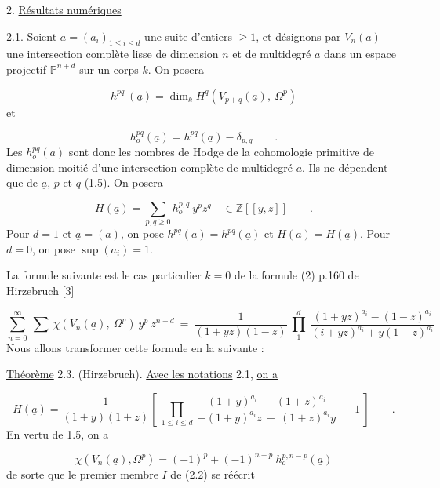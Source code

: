 2. \underline{Résultats numériques}

2.1. Soient $\underline{a}=(a_i)_{1\leq i\leq d}$ une suite d'entiers $\geq 1$, et désignons par $V_n(\underline{a})$ une intersection complète lisse de dimension $n$ et de multidegré $\underline{a}$ dans un espace projectif $\mathbb{P}^{n+d}$ sur un corps $k$. On posera

\begin{equation*}
h^{pq}\ (\underline{a}) = \dim_k H^q(V_{p+q}(\underline{a}),\ \Omega^p)
\end{equation*}
et

\begin{equation*}
h_o^{pq}(\underline{a}) = h^{pq}(\underline{a}) - \delta_{p,q} \qquad .
\end{equation*}
Les $h_o^{pq}(\underline{a})$ sont donc les nombres de Hodge de la cohomologie primitive de dimension moitié d'une intersection complète de multidegré $\underline{a}$. Ils ne dépendent que de $\underline{a}$, $p$ et $q$ (1.5). On posera

\begin{equation}\tag{2.1.1}
H(\underline{a}) = \sum_{p,q\geq 0} h_o^{p,q}\ y^p z^q \quad \in \mathbb{Z}[[y,z]] \qquad .
\end{equation}
Pour $d = 1$ et $\underline{a} = (a)$, on pose $h^{pq}(a) = h^{pq}(\underline{a})$ et $H(a) = H(\underline{a})$. Pour $d = 0$, on pose $\sup(a_i) = 1$.

La formule suivante est le cas particulier $k = 0$ de la formule (2) p.160 de Hirzebruch [3] 



\begin{equation}\tag{2.2}
\sum_{n=0}^{\infty}\ \sum\ \chi(V_n(\underline{a}),\ \Omega^p)\ y^p\ z^{n+d}\ =\ \frac{1}{(1+yz)(1-z)}\ \prod_{1}^{d}\ \frac{(1+yz)^{a_i}-(1-z)^{a_i}}{(i+yz)^{a_i}+y(1-z)^{a_i}}
\end{equation}
Nous allons transformer cette formule en la suivante :

\underline{Théorème} 2.3. (Hirzebruch). \underline{Avec les notations} 2.1, \underline{on a}

\begin{equation*}
H(\underline{a}) = \frac{1}{(1+y)(1+z)}\left[\ \prod_{1\leq i\leq d}\ \frac{(1+y)^{a_i}\ -\ (1+z)^{a_i}}{-(1+y)^{a_i}z\ +\ (1+z)^{a_i}y}\ \ -1\ \right] \qquad .
\end{equation*}
En vertu de 1.5, on a

\begin{equation*}
\chi(V_n(\underline{a}),\Omega^p) = (-1)^p + (-1)^{n-p}\ h_o^{p,n-p}(\underline{a})
\end{equation*}
de sorte que le premier membre $I$ de (2.2) se réécrit

